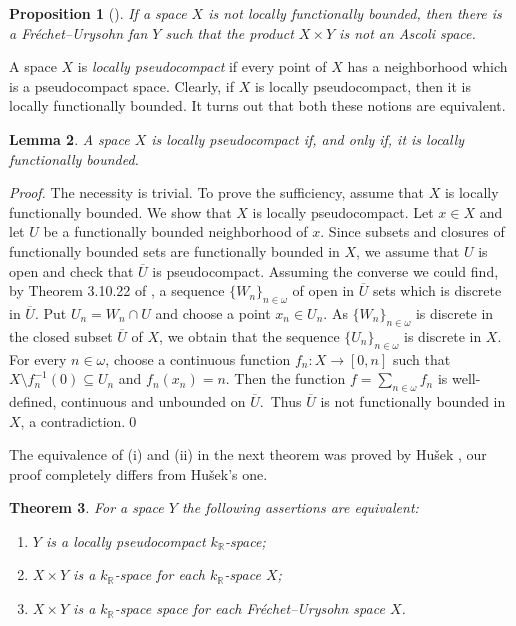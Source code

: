 \documentclass[preprint,11pt]{elsarticle}
\newtheorem{theorem}{Theorem}[section]
\newtheorem{lemma}[theorem]{Lemma}
\newtheorem{proposition}[theorem]{Proposition}
\numberwithin{equation}{section}
\numberwithin{theorem}{section}
\newcommand{\w}{\omega}
\newcommand{\IR}{\mathbb{R}}
\begin{document}
\begin{proposition}[\cite{Gabr-seq-Ascoli}] \label{p:product-Ascoli}
If a space $X$ is not locally functionally bounded, then there is a Fr\'{e}chet--Urysohn fan $Y$ such that the product $X\times Y$ is not an Ascoli space.
\end{proposition}

A space $X$ is {\em locally pseudocompact} if every point of $X$ has a neighborhood which is a pseudocompact space. Clearly, if $X$ is locally pseudocompact, then it is locally functionally bounded. It turns out that both these notions are equivalent.

\begin{lemma} \label{l:lpc=lfb}
A space $X$ is locally pseudocompact if, and only if, it is locally functionally bounded.
\end{lemma}

\begin{proof}
The necessity is trivial. To prove the sufficiency, assume that $X$ is locally functionally bounded. We show that $X$ is locally pseudocompact. Let $x\in X$ and let $U$ be a  functionally bounded neighborhood of $x$. Since subsets and closures of functionally bounded sets are functionally bounded in $X$, we assume that $U$ is open and check that $\overline{U}$ is pseudocompact. Assuming the converse we could find, by Theorem 3.10.22 of \cite{Eng},  a sequence $\{W_n\}_{n\in\w}$ of open in $\overline{U}$ sets which is  discrete in $\overline{U}$. Put $U_n=W_n\cap U$ and choose a point $x_n\in U_n$. As $\{W_n\}_{n\in\w}$ is discrete in the closed subset $\overline{U}$ of $X$, we obtain that the sequence $\{U_n\}_{n\in\w}$  is discrete in $X$. For every $n\in\omega$, choose a continuous function $f_n:X\to [0,n]$ such that $X\setminus f^{-1}_n(0)\subseteq U_n$ and $f_n(x_n)=n$. Then the function $f=\sum_{n\in\omega}f_n$ is well-defined, continuous and unbounded on $\overline{U}$. Thus $\overline{U}$ is not functionally bounded in $X$, a contradiction.\qed
\end{proof}

The equivalence of (i) and (ii) in the next theorem was proved by Hu\v{s}ek \cite[Theorem~1]{Husek}, our proof  completely differs from Hu\v{s}ek's one.
\begin{theorem} \label{t:kR-product-mu}
For a space $Y$ the following assertions are equivalent:
\begin{enumerate}
\item[{\rm (i)}] $Y$ is a locally pseudocompact $k_\IR$-space;
\item[{\rm (ii)}] $X\times Y$ is a $k_\IR$-space for each $k_\IR$-space $X$;
\item[{\rm (iii)}] $X\times Y$ is a $k_\IR$-space space for each Fr\'{e}chet--Urysohn space $X$.
\end{enumerate}
\end{theorem}
\end{document}
